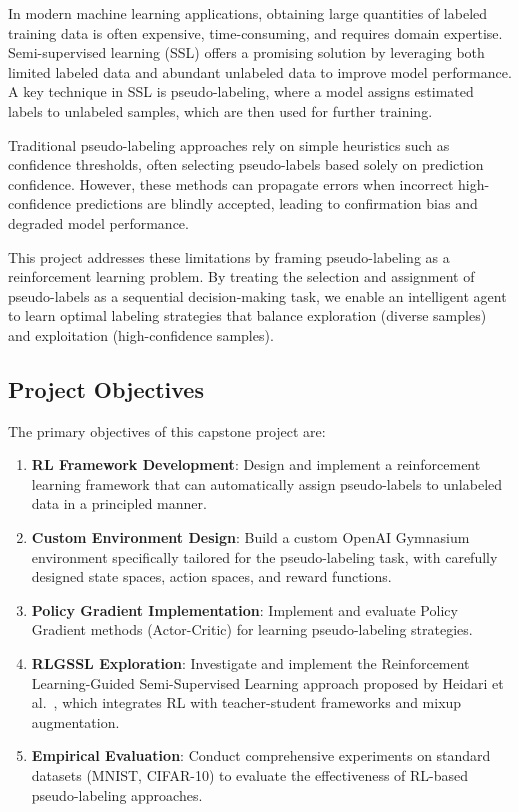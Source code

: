 \documentclass{scrartcl}
\begin{document}
In modern machine learning applications, obtaining large quantities of labeled training data is often expensive, time-consuming, and requires domain expertise. Semi-supervised learning (SSL) offers a promising solution by leveraging both limited labeled data and abundant unlabeled data to improve model performance. A key technique in SSL is pseudo-labeling, where a model assigns estimated labels to unlabeled samples, which are then used for further training.

Traditional pseudo-labeling approaches rely on simple heuristics such as confidence thresholds, often selecting pseudo-labels based solely on prediction confidence. However, these methods can propagate errors when incorrect high-confidence predictions are blindly accepted, leading to confirmation bias and degraded model performance.

This project addresses these limitations by framing pseudo-labeling as a reinforcement learning problem. By treating the selection and assignment of pseudo-labels as a sequential decision-making task, we enable an intelligent agent to learn optimal labeling strategies that balance exploration (diverse samples) and exploitation (high-confidence samples). 

\subsection{Project Objectives}

The primary objectives of this capstone project are:
\begin{enumerate}
    \item \textbf{RL Framework Development}: Design and implement a reinforcement learning framework that can automatically assign pseudo-labels to unlabeled data in a principled manner.
    \item \textbf{Custom Environment Design}: Build a custom OpenAI Gymnasium environment specifically tailored for the pseudo-labeling task, with carefully designed state spaces, action spaces, and reward functions.
    \item \textbf{Policy Gradient Implementation}: Implement and evaluate Policy Gradient methods (Actor-Critic) for learning pseudo-labeling strategies.
    \item \textbf{RLGSSL Exploration}: Investigate and implement the Reinforcement Learning-Guided Semi-Supervised Learning approach proposed by Heidari et al.~\cite{heidari2024rlgssl}, which integrates RL with teacher-student frameworks and mixup augmentation.
    \item \textbf{Empirical Evaluation}: Conduct comprehensive experiments on standard datasets (MNIST, CIFAR-10) to evaluate the effectiveness of RL-based pseudo-labeling approaches.
\end{enumerate}
\end{document}
